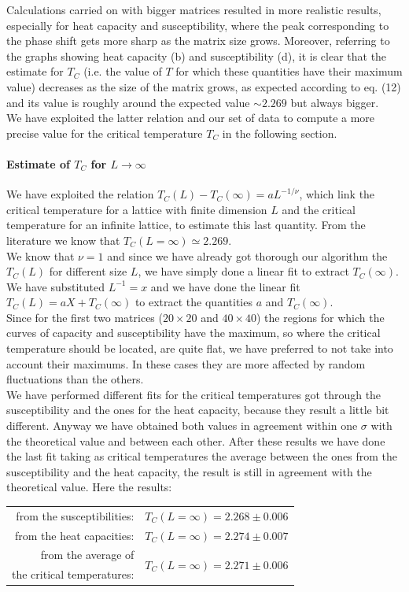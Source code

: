 \documentclass[10pt,a4paper,titlepage]{article}
\begin{document}
\noindent Calculations carried on with bigger matrices resulted in more realistic results, especially for heat capacity and susceptibility, where the peak corresponding to the phase shift gets more sharp as the matrix size grows.
Moreover, referring to the graphs showing heat capacity (b) and susceptibility (d), it is clear that the estimate for $T_{C}$ (i.e. the value of $T$ for which these quantities have their maximum value) decreases as the size of the matrix grows, as expected according to eq. (12) and its value is roughly around the expected value $\sim 2.269$ but always bigger.
\\We have exploited the latter relation and our set of data to compute a more precise value for the critical temperature $T_{C}$ in the following section.
\paragraph{Estimate of $T_{C}$ for $L \rightarrow\infty$} We have exploited the relation $T_C(L)-T_C(\infty)=a L ^{-1/\nu}$, which link the critical temperature for a lattice with finite dimension $L$ and the critical temperature for an infinite lattice, to estimate this last quantity.
From the literature we know that $T_C(L=\infty) \simeq 2.269$.
\\
We know that $\nu=1$ and since we have already got thorough our algorithm the $T_C(L)$ for different size $L$, we have simply done a linear fit to extract $T_C(\infty)$. We have substituted $L^{-1}=x$ and we have done the linear fit $T_C(L)=a X + T_C(\infty)$ to extract the quantities $a$ and $T_C(\infty)$. 
\\
Since for the first two matrices ($20 \times 20$ and $40 \times 40$) the regions for which the curves of capacity and susceptibility have the maximum, so where the critical temperature should be located, are quite flat, we have preferred to not take into account their maximums.  In these cases they are more affected by random fluctuations than the others. 
\\
We have performed different fits for the critical temperatures got through the susceptibility and the ones for the heat capacity, because they result a little bit different. Anyway we have obtained both values in agreement within one $\sigma$ with the theoretical value and between each other. After these results we have done the last fit taking as critical temperatures the average between the ones from the susceptibility and the heat capacity, the result is still in agreement with the theoretical value.
Here the results:   \\
\begin{center}
\begin{tabular}{rl}
from the susceptibilities:& $T_{C}(L=\infty) =2.268 \pm 0.006  $\\
from the heat capacities: & $T_{C}(L=\infty) =2.274 \pm 0.007$  \\
from the average of  & \multirow{ 2}{*}{$T_{C}(L=\infty)=2.271 \pm 0.006   $}\\
the critical temperatures: & 
\end{tabular}
\end{center}
\newpage
\end{document}
